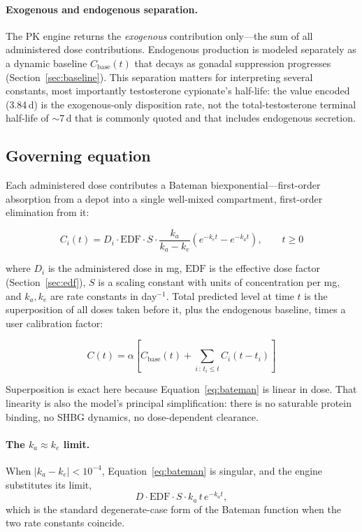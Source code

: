 \documentclass[11pt,a4paper]{article}
\begin{document}
\paragraph{Exogenous and endogenous separation.} The PK engine returns
the \emph{exogenous} contribution only---the sum of all administered
dose contributions. Endogenous production is modeled separately as a
dynamic baseline $C_{\text{base}}(t)$ that decays as gonadal suppression
progresses (Section~\ref{sec:baseline}). This separation matters for
interpreting several constants, most importantly testosterone
cypionate's half-life: the value encoded (3.84\,d) is the
exogenous-only disposition rate, not the total-testosterone terminal
half-life of $\sim$7\,d that is commonly quoted and that includes
endogenous secretion.

\subsection{Governing equation}
\label{sec:governing}

Each administered dose contributes a Bateman biexponential---first-order
absorption from a depot into a single well-mixed compartment, first-order
elimination from it:

\begin{equation}
C_i(t) = D_i \cdot \mathrm{EDF} \cdot S \cdot
         \frac{k_a}{k_a - k_e}\left(e^{-k_e t} - e^{-k_a t}\right),
         \qquad t \ge 0
\label{eq:bateman}
\end{equation}

where $D_i$ is the administered dose in mg, $\mathrm{EDF}$ is the
effective dose factor (Section~\ref{sec:edf}), $S$ is a scaling constant
with units of concentration per mg, and $k_a, k_e$ are rate constants in
day$^{-1}$. Total predicted level at time $t$ is the superposition of
all doses taken before it, plus the endogenous baseline, times a user
calibration factor:

\begin{equation}
C(t) = \alpha\left[C_{\text{base}}(t) + \sum_{i \,:\, t_i \le t} C_i(t - t_i)\right]
\label{eq:superposition}
\end{equation}

Superposition is exact here because Equation~\ref{eq:bateman} is linear
in dose. That linearity is also the model's principal simplification:
there is no saturable protein binding, no SHBG dynamics, no
dose-dependent clearance.

\paragraph{The $k_a \approx k_e$ limit.} When $|k_a - k_e| < 10^{-4}$,
Equation~\ref{eq:bateman} is singular, and the engine substitutes its
limit,
\[
D \cdot \mathrm{EDF} \cdot S \cdot k_a\, t\, e^{-k_a t},
\]
which is the standard degenerate-case form of the Bateman function when
the two rate constants coincide.
\end{document}

